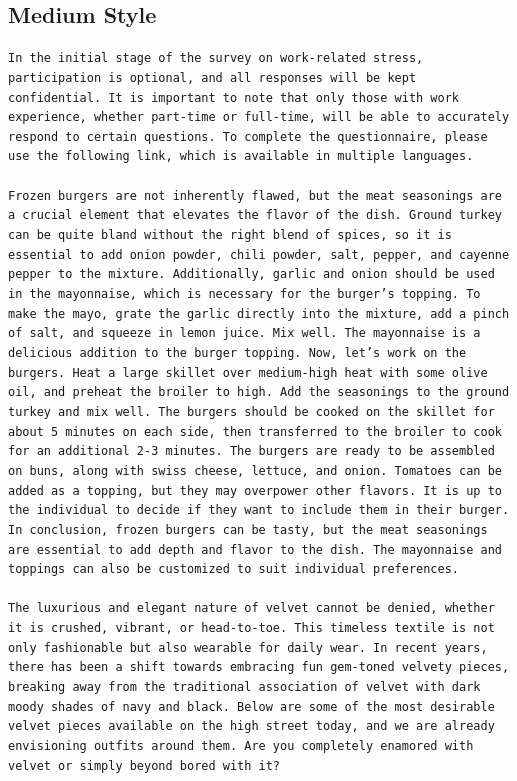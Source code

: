 \documentclass[table]{article}
\begin{document}
\subsection*{Medium Style}
\begin{tcolorbox}[colback=gray!20, colframe=gray!75, rounded corners, sharp corners=northeast, sharp corners=southwest]
\texttt{In the initial stage of the survey on work-related stress, participation is optional, and all responses will be kept confidential. It is important to note that only those with work experience, whether part-time or full-time, will be able to accurately respond to certain questions. To complete the questionnaire, please use the following link, which is available in multiple languages.\\\\
Frozen burgers are not inherently flawed, but the meat seasonings are a crucial element that elevates the flavor of the dish. Ground turkey can be quite bland without the right blend of spices, so it is essential to add onion powder, chili powder, salt, pepper, and cayenne pepper to the mixture. Additionally, garlic and onion should be used in the mayonnaise, which is necessary for the burger's topping. To make the mayo, grate the garlic directly into the mixture, add a pinch of salt, and squeeze in lemon juice. Mix well. The mayonnaise is a delicious addition to the burger topping. Now, let's work on the burgers. Heat a large skillet over medium-high heat with some olive oil, and preheat the broiler to high. Add the seasonings to the ground turkey and mix well. The burgers should be cooked on the skillet for about 5 minutes on each side, then transferred to the broiler to cook for an additional 2-3 minutes. The burgers are ready to be assembled on buns, along with swiss cheese, lettuce, and onion. Tomatoes can be added as a topping, but they may overpower other flavors. It is up to the individual to decide if they want to include them in their burger. In conclusion, frozen burgers can be tasty, but the meat seasonings are essential to add depth and flavor to the dish. The mayonnaise and toppings can also be customized to suit individual preferences.\\\\
The luxurious and elegant nature of velvet cannot be denied, whether it is crushed, vibrant, or head-to-toe. This timeless textile is not only fashionable but also wearable for daily wear. In recent years, there has been a shift towards embracing fun gem-toned velvety pieces, breaking away from the traditional association of velvet with dark moody shades of navy and black. Below are some of the most desirable velvet pieces available on the high street today, and we are already envisioning outfits around them. Are you completely enamored with velvet or simply beyond bored with it?\\\\
}
\end{tcolorbox}
\end{document}
